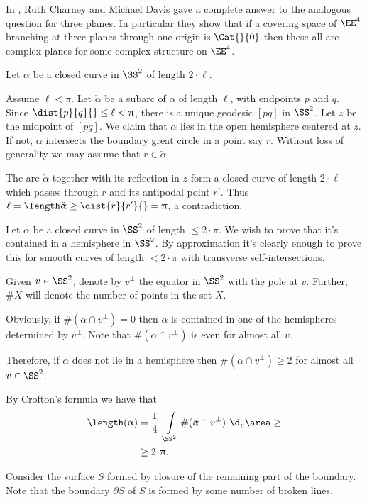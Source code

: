 In \cite{charney-davis-93}, Ruth Charney and Michael Davis
gave a complete answer to the analogous question for three planes.
In particular they show that if a covering space of $\EE^4$
branching at three planes through one origin is $\Cat{}{0}$ then these all are complex planes for some complex structure on $\EE^4$.
\qeds

Let $\alpha$ be a closed curve in $\SS^2$ of length $2\cdot\ell$.

Assume $\ell<\pi$.
Let $\check\alpha$ be a subarc of $\alpha$ of length $\ell$, with endpoints $p$ and $q$. 
Since $\dist{p}{q}{}\le\ell<\pi$, there is a unique geodesic $[pq]$ in $\SS^2$.  
Let $z$ be the midpoint of  $[pq]$.  
We claim that $\alpha$ lies in the open hemisphere centered at $z$.  
If not, $\alpha$ intersects the boundary  great circle in a point say $r$.
Without loss of generality we may assume that $r\in\check\alpha$.

The arc $\check\alpha$ together with its reflection in $z$ form a closed curve of length $2\cdot \ell$ which passes through $r$ and its antipodal point $r'$.
Thus $\ell=\length \check\alpha\ge \dist{r}{r'}{}=\pi$, a contradiction.
\qeds

Let $\alpha$ be a closed curve in  $\SS^2$ of length $\le 2\cdot\pi$.  We wish to prove that it's contained in a hemisphere in $\SS^2$.
By approximation it's clearly enough to prove this for  smooth curves of length $< 2\cdot\pi$ with transverse self-intersections. 

Given $v\in \SS^2$, denote by $v^\perp$ the equator in $\SS^2$ with the pole at $v$.
Further, $\# X$ will denote the number of points in the set $X$.

Obviously,  if $\#(\alpha\cap v^\perp) =0$ then $\alpha$ is contained in one of the hemispheres determined by $v^\perp$. 
Note that $\#(\alpha\cap v^\perp)$ is even for almost all $v$.

Therefore, if $\alpha$ does not lie in a hemisphere then
$\#(\alpha\cap v^\perp) \ge 2$ for almost all $v\in\SS^2$.  

By Crofton's formula we have that
\begin{align*}
\length(\alpha)
&=\frac 1 4\cdot \int\limits_{\SS^2}\#(\alpha\cap v^\perp)\cdot \d_v\area\ge
\\
&\ge2\cdot\pi.
\end{align*}
\qedsf

Consider the surface $S$ 
formed by closure of the remaining part of the boundary.
Note that the boundary $\partial S$ of $S$ is formed by some number of broken lines.

